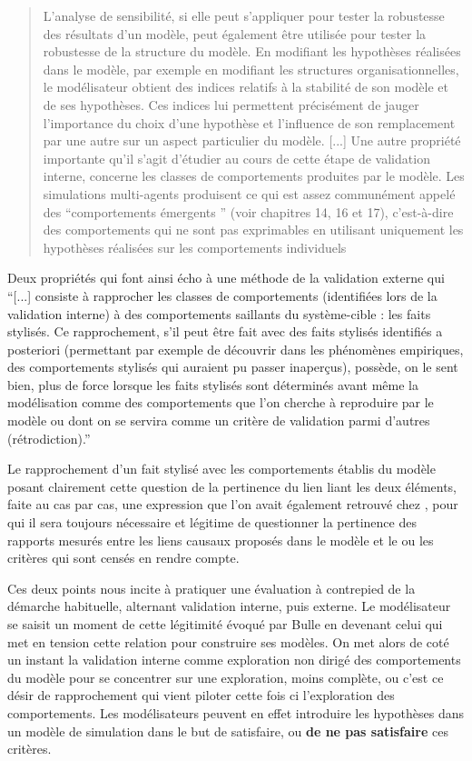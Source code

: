 \blockquote[\cite{Amblard2006}]{L'analyse de sensibilité, si elle peut s'appliquer pour tester la robustesse des résultats d'un modèle, peut également être utilisée pour tester la robustesse de la structure du modèle. En modifiant les hypothèses réalisées dans le modèle, par exemple en modifiant les structures organisationnelles, le modélisateur obtient des indices relatifs à la stabilité de son modèle et de ses hypothèses. Ces indices lui permettent précisément de jauger l'importance du choix d’une hypothèse et l’influence de son remplacement par une autre sur un aspect particulier du modèle. [...] Une autre propriété importante qu'il s'agit d'étudier au cours de cette étape de validation interne, concerne les classes de comportements produites par le modèle. Les simulations multi-agents produisent ce qui est assez communément appelé des \enquote{comportements émergents }  (voir chapitres 14, 16 et 17), c'est-à-dire des comportements qui ne sont pas exprimables en utilisant uniquement les hypothèses réalisées sur les comportements individuels}. Deux propriétés qui font ainsi écho à une méthode de la validation externe qui \enquote{[...] consiste à rapprocher les classes de comportements (identifiées lors de la validation interne) à des comportements saillants du système-cible : les faits stylisés. Ce rapprochement, s’il peut être fait avec des faits stylisés identifiés a posteriori (permettant par exemple de découvrir dans les phénomènes empiriques, des comportements stylisés qui auraient pu passer inaperçus), possède, on le sent bien, plus de force lorsque les faits stylisés sont déterminés avant même la modélisation comme des comportements que l'on cherche à reproduire par le modèle ou dont on se servira comme un critère de validation parmi d'autres (rétrodiction).}

Le rapprochement d’un fait stylisé avec les comportements établis du modèle posant clairement cette question de la pertinence du lien liant les deux éléments, faite au cas par cas, une expression que l’on avait également retrouvé chez \textcite{Bulle2005}, pour qui il sera toujours nécessaire et légitime de questionner la pertinence des rapports mesurés entre les liens causaux proposés dans le modèle et le ou les critères qui sont censés en rendre compte. 

Ces deux points nous incite à pratiquer une évaluation à contrepied de la démarche habituelle, alternant validation interne, puis externe. Le modélisateur se saisit un moment de cette légitimité évoqué par Bulle en devenant celui qui met en tension cette relation pour construire ses modèles. On met alors de coté un instant la validation interne comme exploration non dirigé des comportements du modèle pour se concentrer sur une exploration, moins complète, ou c'est ce désir de rapprochement qui vient piloter cette fois ci l'exploration des comportements. Les modélisateurs peuvent en effet introduire les hypothèses dans un modèle de simulation dans le but de satisfaire, ou \textbf{de ne pas satisfaire} ces critères. 

